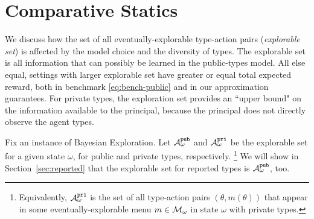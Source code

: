 
\section{Comparative Statics}
\label{sec:statics}

\newcommand{\pairs}{\AExp_{\omega}}
\newcommand{\pairsPub}{\pairs^{\term{pub}}}
\newcommand{\pairsPri}{\pairs^{\term{pri}}}

\newcommand{\support}{\term{support}}

We discuss how the set of all eventually-explorable type-action pairs (\emph{explorable set}) is affected by the model choice and the diversity of types. The explorable set is all information that can possibly be learned in the public-types model. All else equal, settings with larger explorable set have greater or equal total expected reward, both in benchmark \eqref{eq:bench-public} and in our approximation guarantees. For private types, the exploration set provides an ``upper bound" on the information available to the principal, because the principal does not directly observe the agent types.

Fix an instance of Bayesian Exploration. Let $\pairsPub$ and $\pairsPri$ be the explorable set for a given state $\omega$, for public and private types, respectively.%
\footnote{Equivalently, $\pairsPri$ is the set of all type-action pairs $(\theta,m(\theta))$ that appear in some eventually-explorable menu $m\in \mathcal{M}_{\omega}$ in state $\omega$ with private types.}
We will show in Section~\ref{sec:reported} that the explorable set for reported types is $\pairsPub$, too.


